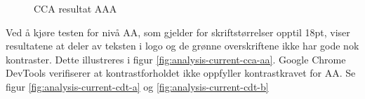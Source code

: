 \begin{figure}[H]
    \centering
    \caption{CCA resultat AAA}
    \label{fig:analysis-current-cca-aaa}
\end{figure}

Ved å kjøre testen  for nivå AA, som gjelder for skriftstørrelser opptil 18pt, viser resultatene at deler av teksten i logo og de grønne overskriftene ikke har gode nok kontraster. Dette illustreres i figur \ref{fig:analysis-current-cca-aa}. Google Chrome DevTools verifiserer at kontrastforholdet ikke oppfyller kontrastkravet for AA. Se figur \ref{fig:analysis-current-cdt-a} og \ref{fig:analysis-current-cdt-b}

